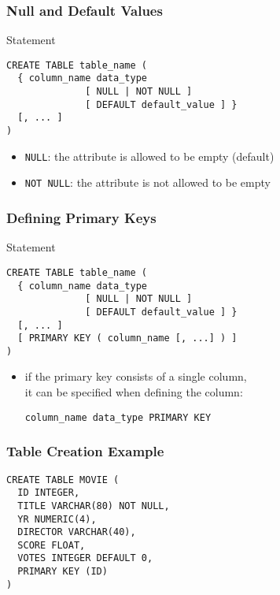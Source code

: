 \documentclass[dvipsnames]{beamer}
\theoremstyle{plain}
\begin{document}
\begin{frame}[fragile]
  \frametitle{Null and Default Values}

  \begin{block}{Statement}
    \begin{lstlisting}
CREATE TABLE table_name (
  { column_name data_type
              [ NULL | NOT NULL ]
              [ DEFAULT default_value ] }
  [, ... ]
)
    \end{lstlisting}
  \end{block}

  \pause
  \begin{itemize}
    \item \texttt{NULL}: the attribute is allowed to be empty (default)
    \item \texttt{NOT NULL}: the attribute is not allowed to be empty
  \end{itemize}
\end{frame}

\begin{frame}[fragile]
  \frametitle{Defining Primary Keys}

  \begin{block}{Statement}
    \begin{lstlisting}
CREATE TABLE table_name (
  { column_name data_type
              [ NULL | NOT NULL ]
              [ DEFAULT default_value ] }
  [, ... ]
  [ PRIMARY KEY ( column_name [, ...] ) ]
)
    \end{lstlisting}
  \end{block}

  \pause
  \begin{itemize}
    \item if the primary key consists of a single column,\\
      it can be specified when defining the column:
      \begin{lstlisting}
column_name data_type PRIMARY KEY
      \end{lstlisting}
  \end{itemize}
\end{frame}

\begin{frame}[fragile]
  \frametitle{Table Creation Example}

  \begin{example}
    \begin{lstlisting}
CREATE TABLE MOVIE (
  ID INTEGER,
  TITLE VARCHAR(80) NOT NULL,
  YR NUMERIC(4),
  DIRECTOR VARCHAR(40),
  SCORE FLOAT,
  VOTES INTEGER DEFAULT 0,
  PRIMARY KEY (ID)
)
    \end{lstlisting}
  \end{example}
\end{frame}
\end{document}
